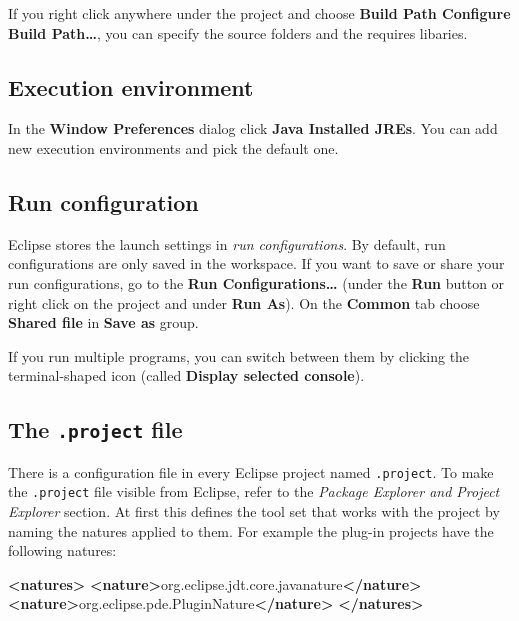 \documentclass[]{report}
\newenvironment{Shaded}{}{}
\newcommand{\KeywordTok}[1]{\textcolor[rgb]{0.00,0.44,0.13}{\textbf{{#1}}}}
\newcommand{\NormalTok}[1]{{#1}}
\begin{document}
If you right click anywhere under the project and choose \textbf{Build
Path \textbar{} Configure Build Path\ldots{}}, you can specify the
source folders and the requires libaries.

\subsection{Execution environment}

In the \textbf{Window \textbar{} Preferences} dialog click \textbf{Java
\textbar{} Installed JREs}. You can add new execution environments and
pick the default one.

\subsection{Run configuration}

Eclipse stores the launch settings in \emph{run configurations}. By
default, run configurations are only saved in the workspace. If you want
to save or share your run configurations, go to the \textbf{Run
Configurations\ldots{}} (under the \textbf{Run} button or right click on
the project and under \textbf{Run As}). On the \textbf{Common} tab
choose \textbf{Shared file} in \textbf{Save as} group.

If you run multiple programs, you can switch between them by clicking
the terminal-shaped icon (called \textbf{Display selected console}).

\subsection{The \texttt{.project} file}

There is a configuration file in every Eclipse project named
\texttt{.project}. To make the \texttt{.project} file visible from
Eclipse, refer to the \emph{Package Explorer and Project Explorer}
section. At first this defines the tool set that works with the project
by naming the natures applied to them. For example the plug-in projects
have the following natures:

\begin{Shaded}
\begin{Highlighting}[]
\KeywordTok{<natures>}
    \KeywordTok{<nature>}\NormalTok{org.eclipse.jdt.core.javanature}\KeywordTok{</nature>}
    \KeywordTok{<nature>}\NormalTok{org.eclipse.pde.PluginNature}\KeywordTok{</nature>}
\KeywordTok{</natures>}
\end{Highlighting}
\end{Shaded}
\end{document}
